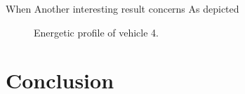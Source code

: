 \begin{bibunit}[ieeetr]
When 
Another interesting result concerns 
As depicted 


\begin{figure}[h]
\centering

\caption{Energetic profile of vehicle 4.}
\label{fig:plotProfileV4}
\end{figure}

%

\newpage
\section{Conclusion} \label{sec:energyExp:conclusion}




\end{bibunit}
